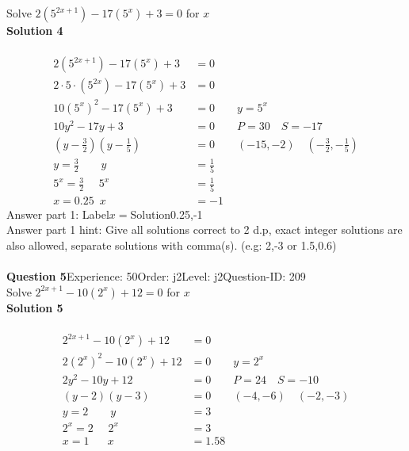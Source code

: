 \documentclass{article}
\begin{document}
Solve $2(5^{2x+1})-17(5^x)+3=0$ for $x$\\[4pt]
\noindent\textbf{Solution 4}\\[2pt]
\\[-35pt]\begin{align*}
2(5^{2x+1})-17(5^x)+3&=0\\[2pt]
2\!\cdot\!5\!\cdot\!(5^{2x})-17(5^x)+3&=0\\[2pt]
10(5^{x})^2-17(5^x)+3&=0\qquad y=5^x\\[2pt]
10y^2-17y+3&=0\qquad P=30 \quad S=-17\\[2pt]
\left(y-\displaystyle\frac{3}{2}\right)\left(y-\displaystyle\frac{1}{5}\right)&=0\qquad (-15,-2)\quad \left(-\displaystyle\frac{3}{2},-\displaystyle\frac{1}{5}\right)\\[2pt]
y=\displaystyle\frac{3}{2} \qquad y&=\displaystyle\frac{1}{5}\\[2pt]
5^x=\displaystyle\frac{3}{2}\hspace{16pt} 5^x&=\displaystyle\frac{1}{5}\\[2pt]
x=0.25 \hspace{6pt} x&=-1
\end{align*}
Answer part 1: \hspace{10pt}Label\hspace{10pt}$x=$\hspace{10pt}Solution\hspace{10pt}0.25,-1\\
Answer part 1 hint: \hspace{15pt}Give all solutions correct to 2 d.p, exact integer solutions are also allowed, separate solutions with comma(s).  (e.g:  2,-3 or 1.5,0.6)  \\
\\[4pt]
\noindent\textbf{Question 5}\hspace{20pt}Experience: 50\hspace{20pt}Order: j2\hspace{20pt}Level: j2\hspace{20pt}Question-ID: 209\\[2pt]
Solve $2^{2x+1}-10(2^x)+12=0$ for $x$\\[4pt]
\noindent\textbf{Solution 5}\\[2pt]
\\[-35pt]\begin{align*}
2^{2x+1}-10(2^x)+12&=0\\[2pt]
2(2^x)^2-10(2^x)+12&=0\qquad y=2^x\\[2pt]
2y^2-10y+12&=0\qquad P=24 \quad S=-10\\[2pt]
(y-2)(y-3)&=0\qquad (-4,-6)\quad (-2,-3)\\[2pt]
y=2 \qquad y&=3\\[2pt]
2^x=2\hspace{16pt} 2^x&=3\\[2pt]
x=1 \hspace{20pt} x&=1.58
\end{align*}
\end{document}
